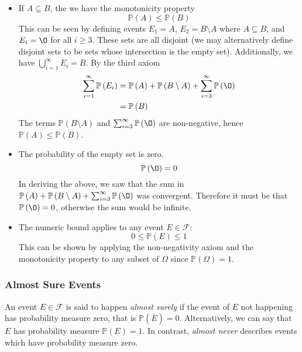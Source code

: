 \documentclass[11pt]{report} %
\begin{document}
\begin{itemize}
\item If $A \subseteq B$, the we have the monotonicity property
\begin{equation}
\mathbb{P}\left(A\right) \leq \mathbb{P}\left(B\right)
\end{equation}
This can be seen by defining events $E_{1} = A$, $E_{2} = B\setminus A$ where $A\subseteq B$, and $E_{i} = \O$ for all $i\geq 3$. These sets are all disjoint (we may alternatively define disjoint sets to be sets whose intersection is the empty set). Additionally, we have $\bigcup_{i = 1}^{\infty}E_{i} = B$. By the third axiom
\begin{align}
\sum_{i = 1}^{\infty}\mathbb{P}\left(E_{i}\right) &= \mathbb{P}\left(A\right) + \mathbb{P}\left(B\setminus A\right) + \sum_{i = 3}^{\infty}\mathbb{P}\left(\O\right) \\
&= \mathbb{P}\left(B\right)
\end{align}
The terms $\mathbb{P}\left(B\setminus A\right)$ and $\sum_{i = 3}^{\infty}\mathbb{P}\left(\O\right)$ are non-negative, hence $\mathbb{P}\left(A\right) \leq \mathbb{P}\left(B\right)$.
\item The probability of the empty set is zero.
\begin{equation}
\mathbb{P}\left(\O\right) = 0
\end{equation}
In deriving the above, we saw that the sum in $\mathbb{P}\left(A\right) + \mathbb{P}\left(B\setminus A\right) + \sum_{i = 3}^{\infty}\mathbb{P}\left(\O\right)$ was convergent. Therefore it must be that $\mathbb{P}\left(\O\right) = 0$, otherwise the sum would be infinite.
\item The numeric bound applies to any event $E \in \mathcal{F}$:
\begin{equation}
0 \leq \mathbb{P}\left(E\right) \leq 1
\end{equation}
This can be shown by applying the non-negativity axiom and the monotonicity property to any subset of $\Omega$ since $\mathbb{P}\left(\Omega\right) = 1$.
\end{itemize}

\subsubsection{Almost Sure Events}

An event $E\in\mathcal{F}$ is said to happen \textit{almost surely} if the event of $E$ not happening has probability measure zero, that is $\mathbb{P}\left(\overline{E}\right) = 0$. Alternatively, we can say that $E$ has probability measure $\mathbb{P}\left(E\right) = 1$. In contrast, \textit{almost never} describes events which have probability measure zero.
\end{document}
